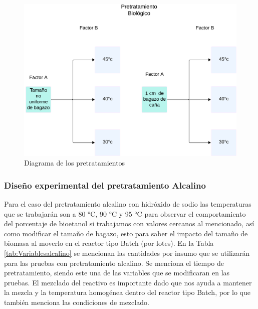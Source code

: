\documentclass[12pt]{article}
\begin{document}
		\begin{figure} [h!]
			\centering
			\includegraphics[width=0.7\linewidth]{imagenes/diagramabiologico}
			\caption{Diagrama de los pretratamientos}
			\label{Diagrama biologico}
		\end{figure}
		
		
		
		
		
	
		
	\subsubsection{ Diseño experimental del pretratamiento Alcalino}
	\label{Diseño factorial del pretratamiento alcalino}

Para el caso del pretratamiento alcalino con hidróxido de sodio las temperaturas que se trabajarán son a 80 °C, 90 °C y 95 °C para observar el comportamiento del porcentaje de bioetanol si trabajamos con valores cercanos al mencionado, así como modificar el tamaño de bagazo, esto para saber el impacto del tamaño de biomasa al moverlo en el reactor tipo Batch (por lotes).
En la Tabla \ref{tab:Variablesalcalino} se mencionan las cantidades por insumo que se utilizarán para las pruebas con pretratamiento alcalino. Se menciona el tiempo de pretratamiento, siendo este una de las variables que se modificaran en las pruebas. El mezclado del reactivo es importante dado que nos ayuda a mantener la mezcla y la temperatura homogénea dentro del reactor tipo Batch, por lo que también menciona las condiciones de mezclado.
\end{document}
